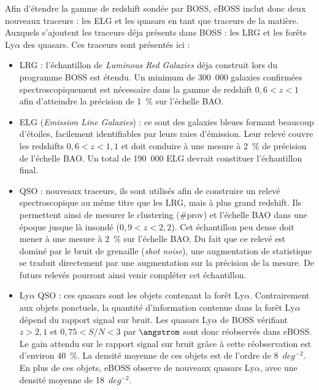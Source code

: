 \documentclass[11pt, twoside, a4paper, openright]{report}
\begin{document}
Afin d'étendre la gamme de redshift sondée par BOSS, eBOSS inclut donc deux nouveaux traceurs : les ELG et les quasars en tant que traceurs de la matière. Auxquels s'ajoutent les traceurs déja présents dans BOSS : les LRG et les forêts Ly$\alpha$ des quasars. Ces traceurs sont présentés ici :
\begin{itemize}
\item LRG : l'échantillon de \emph{Luminous Red Galaxies} déja construit lors du programme BOSS est étendu. Un minimum de 300~000 galaxies confirmées spectroscopiquement est nécessaire dans la gamme de redshift $0,6 < z < 1$ afin d'atteindre la précision de 1~\% sur l'échelle BAO.
\item ELG (\emph{Emission Line Galaxies}) : ce sont des galaxies bleues formant beaucoup d'étoiles, facilement identifiables par leurs raies d'émission. Leur relevé couvre les redshifts $0,6 < z < 1,1$ et doit conduire à une mesure à 2~\% de précision de l'échelle BAO. Un total de 190~000 ELG devrait constituer l'échantillon final.
\item QSO : nouveaux traceurs, ils sont utilisés afin de construire un relevé spectroscopique au même titre que les LRG, mais à plus grand redshift. Ils permettent ainsi de mesurer le clustering (\#prov) et l'échelle BAO dans une époque jusque là insondé ($0,9 < z < 2,2$). Cet échantillon peu dense doit mener à une mesure à 2~\% sur l'échelle BAO. Du fait que ce relevé est dominé par le bruit de grenaille (\emph{shot noise}), une augmentation de statistique se traduit directement par une augmentation sur la précision de la mesure. De futurs relevés pourront ainsi venir compléter cet échantillon.
\item Ly$\alpha$ QSO : ces quasars sont les objets contenant la forêt Ly$\alpha$. Contrairement aux objets ponctuels, la quantité d'information contenue dans la forêt Ly$\alpha$ dépend du rapport signal sur bruit. Les quasars Ly$\alpha$ de BOSS vérifiant $z > 2,1$ et $0,75 < S/N < 3$ par $\angstrom$ sont donc réobservés dans eBOSS. Le gain attendu sur le rapport signal sur bruit grâce à cette réobservation est d'environ 40~\%. La densité moyenne de ces objets est de l'ordre de 8~$deg^{-2}$. \\
  En plus de ces objets, eBOSS observe de nouveaux quasars Ly$\alpha$, avec une densité moyenne de 18~$deg^{-2}$.
\end{itemize} 
\end{document}
